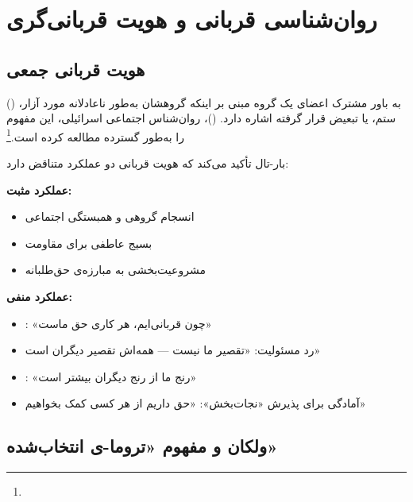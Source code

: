 \section{روان‌شناسی قربانی و هویت قربانی‌گری}
\label{sec:ch11-victim-psychology}

\subsection{هویت قربانی جمعی}
\label{subsec:ch11-collective-victimhood}

 () به باور مشترک اعضای یک گروه مبنی بر اینکه گروهشان به‌طور ناعادلانه مورد آزار، ستم، یا تبعیض قرار گرفته اشاره دارد.  ()، روان‌شناس اجتماعی اسرائیلی، این مفهوم را به‌طور گسترده مطالعه کرده است.\footnote{}

بار-تال تأکید می‌کند که هویت قربانی دو عملکرد متناقض دارد:

\begin{tcolorbox}[wavebox, title={دو چهره‌ی هویت قربانی}]
\textbf{عملکرد مثبت:}
\begin{itemize}
\item انسجام گروهی و همبستگی اجتماعی
\item بسیج عاطفی برای مقاومت
\item مشروعیت‌بخشی به مبارزه‌ی حق‌طلبانه
\end{itemize}

\textbf{عملکرد منفی:}
\begin{itemize}
\item {}: «چون قربانی‌ایم، هر کاری حق ماست»
\item رد مسئولیت: «تقصیر ما نیست — همه‌اش تقصیر دیگران است»
\item {}: «رنج ما از رنج دیگران بیشتر است»
\item آمادگی برای پذیرش «نجات‌بخش»: «حق داریم از هر کسی کمک بخواهیم»
\end{itemize}
\end{tcolorbox}

\subsection{ولکان و مفهوم «تروما-ی انتخاب‌شده»}
\label{subsec:ch11-chosen-trauma}


